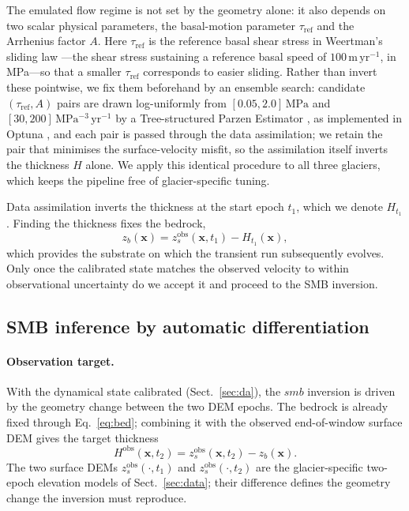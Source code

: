 The emulated flow regime is not set by the geometry alone: it also depends on two
scalar physical parameters, the basal-motion parameter $\tau_{\mathrm{ref}}$ and
the Arrhenius factor $A$. Here $\tau_{\mathrm{ref}}$ is the reference
basal shear stress in Weertman's sliding law \citep{weertman1957}---the shear stress sustaining a
reference basal speed of $100\,\mathrm{m\,yr^{-1}}$, in MPa---so that a smaller
$\tau_{\mathrm{ref}}$ corresponds
to easier sliding. Rather than invert these pointwise, we fix them beforehand by an
ensemble search: candidate $(\tau_{\mathrm{ref}}, A)$ pairs are drawn log-uniformly
from $[0.05, 2.0]\,\mathrm{MPa}$ and $[30, 200]\,\mathrm{MPa^{-3}\,yr^{-1}}$ by a
Tree-structured Parzen Estimator \citep[TPE;][]{bergstra2011}, as implemented in
Optuna \citep{akiba2019}, and each pair is passed
through the data assimilation; we retain the pair that minimises the
surface-velocity misfit, so the assimilation itself inverts the thickness $H$ alone.
We apply this identical procedure to all three glaciers, which keeps the pipeline
free of glacier-specific tuning. 

Data assimilation inverts the thickness at the start epoch $t_1$, which we
denote $H_{t_1}$. Finding the thickness fixes the bedrock,
\begin{equation}
  z_b(\mathbf{x}) = z_s^{\mathrm{obs}}(\mathbf{x}, t_1) - H_{t_1}(\mathbf{x}),
  \label{eq:bed}
\end{equation}
which provides the substrate on which the transient run subsequently evolves.
Only once the calibrated state matches the observed velocity
to within observational uncertainty do we accept it and proceed to the SMB
inversion.

\subsection{SMB inference by automatic differentiation}\label{sec:inference}

\paragraph{Observation target.}
With the dynamical state calibrated (Sect.~\ref{sec:da}), the $smb$ inversion
is driven by the geometry change between the two DEM epochs. The bedrock is already
fixed through Eq.~\eqref{eq:bed}; combining it with the observed end-of-window
surface DEM gives the target thickness
\begin{equation}
  H^{\mathrm{obs}}(\mathbf{x}, t_2) = z_s^{\mathrm{obs}}(\mathbf{x}, t_2) - z_b(\mathbf{x}).
  \label{eq:hobs}
\end{equation}
The two surface DEMs $z_s^{\mathrm{obs}}(\cdot, t_1)$ and
$z_s^{\mathrm{obs}}(\cdot, t_2)$ are the glacier-specific two-epoch elevation models
of Sect.~\ref{sec:data}; their difference defines the geometry change the inversion
must reproduce.
